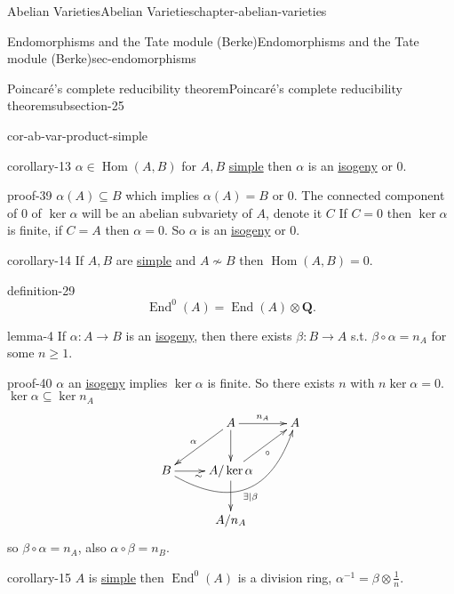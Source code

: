 \documentclass[oneside,10pt,]{book}
\numberwithin{equation}{section}
\newcommand{\QQ}{\mathbf{Q}}
\DeclareMathOperator{\End}{End}
\DeclareMathOperator{\Hom}{Hom}
\begin{document}
\begin{chapterptx}{Abelian Varieties}{}{Abelian Varieties}{}{}{chapter-abelian-varieties}
\begin{sectionptx}{Endomorphisms and the Tate module (Berke)}{}{Endomorphisms and the Tate module (Berke)}{}{}{sec-endomorphisms}
\begin{subsectionptx}{Poincaré's complete reducibility theorem}{}{Poincaré's complete reducibility theorem}{}{}{subsection-25}
\begin{corollary}{}{}{cor-ab-var-product-simple}
\end{corollary}
\begin{corollary}{}{}{corollary-13}%
\hypertarget{p-214}{}%
\(\alpha \in \Hom(A,B)\) for \(A,B\) \hyperref[def-simple-av]{simple} then \(\alpha\) is an \hyperref[def-supersing-isog-isog]{isogeny} or \(0\).%
\end{corollary}
\begin{proofptx}{}{proof-39}
\hypertarget{p-215}{}%
\(\alpha(A) \subseteq B\) which implies \(\alpha(A)  = B\) or \(0\). The connected component of 0 of \(\ker \alpha\) will be an abelian subvariety of \(A\), denote it \(C\) If \(C = 0\) then \(\ker \alpha\) is finite, if \(C = A\) then \(\alpha = 0\). So \(\alpha\) is an \hyperref[def-supersing-isog-isog]{isogeny} or \(0\).%
\end{proofptx}
\begin{corollary}{}{}{corollary-14}%
\hypertarget{p-216}{}%
If \(A,B\) are \hyperref[def-simple-av]{simple} and  \(A\not\sim B\) then \(\Hom(A,B) = 0\).%
\end{corollary}
\begin{definition}{}{definition-29}%
\hypertarget{p-217}{}%
%
\begin{equation*}
\End^0(A) = \End(A) \otimes \QQ\text{.}
\end{equation*}
%
\end{definition}
\begin{lemma}{}{}{lemma-4}%
\hypertarget{p-218}{}%
If \(\alpha \colon A\to B\) is an \hyperref[def-supersing-isog-isog]{isogeny}, then there exists \(\beta \colon B\to A\) s.t. \(\beta \circ \alpha = n_A\) for some \(n \ge 1\).%
\end{lemma}
\begin{proofptx}{}{proof-40}
\hypertarget{p-219}{}%
\(\alpha\) an \hyperref[def-supersing-isog-isog]{isogeny} implies \(\ker \alpha\) is finite. So there exists \(n\) with \(n \ker \alpha = 0\). \(\ker\alpha \subseteq \ker n_A\)%
\begin{equation*}
\xymatrix{
& A \ar[dl]_\alpha \ar[d]\ar[r]^{n_A} & A \\
B\ar[r]_\sim \ar@/_3.0pc/[urr]_{\exists | \beta} & A/\ker\alpha \ar[d]\ar[ur]_{\circ} &\\
& A/n_A &
}
\end{equation*}
so \(\beta\circ \alpha = n_A\), also \(\alpha \circ \beta = n_B\).%
\end{proofptx}
\begin{corollary}{}{}{corollary-15}%
\hypertarget{p-220}{}%
\(A\) is \hyperref[def-simple-av]{simple} then \(\End^0(A)\) is a division ring, \(\alpha^{-1} = \beta \otimes \frac 1n\).%

\end{corollary}
\end{subsectionptx}
\end{sectionptx}
\end{chapterptx}
\end{document}

